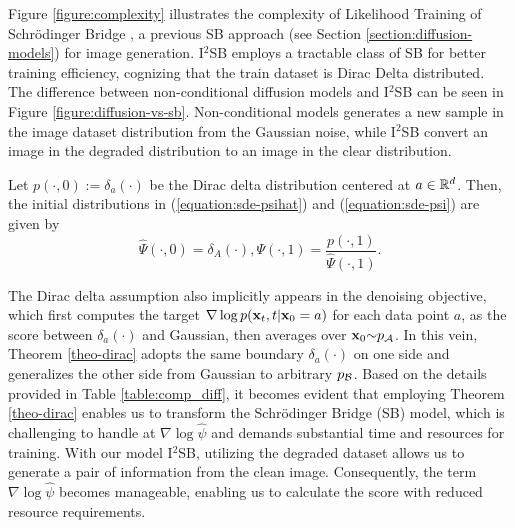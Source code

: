 Figure \ref{figure:complexity} illustrates the complexity of Likelihood Training of Schrödinger Bridge \cite{chen2021likelihood}, a previous SB approach (see Section \ref{section:diffusion-models}) for image generation. I$^2$SB employs a tractable class of SB for better training efficiency, cognizing that the train dataset is Dirac Delta distributed. The difference between non-conditional diffusion models and I$^2$SB can be seen in Figure \ref{figure:diffusion-vs-sb}. Non-conditional models generates a new sample in the image dataset distribution from the Gaussian noise, while I$^2$SB convert an image in the degraded distribution to an image in the clear distribution. 

\begin{sbtheorem}
  \label{theo-dirac}
  Let $p(\cdot,0) := \delta_a(\cdot)$ be the Dirac delta distribution centered at $a\in\mathbb{R}^d$. Then, the initial distributions in (\ref{equation:sde-psihat}) and (\ref{equation:sde-psi}) are given by
  \begin{equation}
    \label{equation:sb-dirac}
    \hat{\Psi}(\cdot,0)= \delta_A(\cdot), \Psi(\cdot,1)=\dfrac{p(\cdot, 1)}{\hat{\Psi}(\cdot,1)}.
  \end{equation}
\end{sbtheorem}

The Dirac delta assumption also implicitly appears in the denoising objective, which first computes the target $\nabla\log p(\mathbf{x}_t,t|\mathbf{x}_0=a)$ for each data point $a$, as the score between $\delta_{a}(\cdot)$ and Gaussian, then averages over $\mathbf{x}_0 {\sim} p_{\mathcal{A}}$. In this vein, Theorem \ref{theo-dirac} adopts the same boundary $\delta_{a}(\cdot)$ on one side and generalizes the other side from Gaussian to arbitrary $p_{\mathcal{B}}$. Based on the details provided in Table \ref{table:comp_diff}, it becomes evident that employing Theorem \ref{theo-dirac} enables us to transform the Schrödinger Bridge (SB) model, which is challenging to handle at $\nabla\log\hat{\psi}$ and demands substantial time and resources for training. With our model I$^2$SB, utilizing the degraded dataset allows us to generate a pair of information from the clean image. Consequently, the term $\nabla\log\hat{\psi}$ becomes manageable, enabling us to calculate the score with reduced resource requirements.


